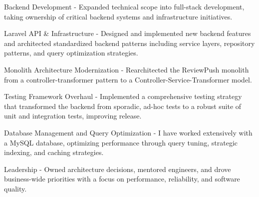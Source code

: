 \begin{cventries}
{\begin{cvsubitems}
        \end{cvsubitems}
        \begin{cvitems} %
            \item {Backend Development - Expanded technical scope into full-stack development, taking ownership of critical backend systems and infrastructure initiatives.}
        \end{cvitems}
        \begin{cvsubitems}
            \item {Laravel API \& Infrastructure - Designed and implemented new backend features and architected standardized backend patterns including service layers, repository patterns, and query optimization strategies.}
            \item {Monolith Architecture Modernization - Rearchitected the ReviewPush monolith from a controller-transformer pattern to a Controller-Service-Transformer model.}
            \item {Testing Framework Overhaul - Implemented a comprehensive testing strategy that transformed the backend from sporadic, ad-hoc tests to a robust suite of unit and integration tests, improving release.}
            \item {Database Management and Query Optimization - I have worked extensively with a MySQL database, optimizing performance through query tuning, strategic indexing, and caching strategies.}
        \end{cvsubitems}
        \begin{cvitems}
            \item {Leadership - Owned architecture decisions, mentored engineers, and drove business-wide priorities with a focus on performance, reliability, and software quality.}
        \end{cvitems}
    }
\end{cventries}
